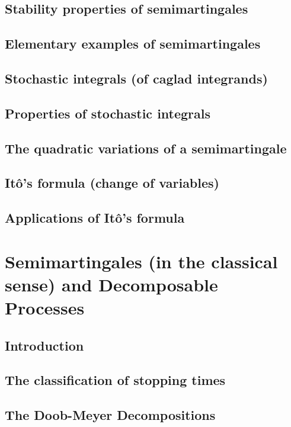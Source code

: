 \documentclass[openany,oneside]{book}
\theoremstyle{definition}
\theoremstyle{remark}
\begin{document}
\section{Stability properties of semimartingales}

\section{Elementary examples of semimartingales}

\section{Stochastic integrals (of caglad integrands)}

\section{Properties of stochastic integrals}

\section{The quadratic variations of a semimartingale}

\section{It\^o's formula (change of variables)}

\section{Applications of It\^o's formula}


\chapter{Semimartingales (in the classical sense) and Decomposable Processes}

\section{Introduction}

\section{The classification of stopping times}

\section{The Doob-Meyer Decompositions}
\end{document}
